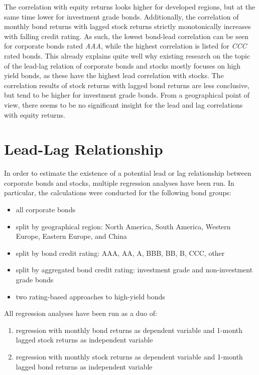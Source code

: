 The correlation with equity returns looks higher for developed regions, but at the same time lower for investment grade bonds. 
Additionally, the correlation of monthly bond returns with lagged stock returns strictly monotonically increases with falling credit rating. As such, the lowest bond-lead correlation can be seen for corporate bonds rated \textit{AAA}, while the highest correlation is listed for \textit{CCC} rated bonds. This already explains quite well why existing research on the topic of the lead-lag relation of corporate bonds and stocks mostly focuses on high yield bonds, as these have the highest lead correlation with stocks. The correlation results of stock returns with lagged bond returns are less conclusive, but tend to be higher for investment grade bonds. From a geographical point of view, there seems to be no significant insight for the lead and lag correlations with equity returns. 

\section{Lead-Lag Relationship} \label{section:lead-lag-relationship}
In order to estimate the existence of a potential lead or lag relationship between corporate bonds and stocks, multiple regression analyses have been run. In particular, the calculations were conducted for the following bond groups: 
\begin{itemize}
	\item all corporate bonds
	\item split by geographical region: North America, South America, Western Europe, Eastern Europe, and China
	\item split by bond credit rating: AAA, AA, A, BBB, BB, B, CCC, other
	\item split by aggregated bond credit rating: investment grade and non-investment grade bonds
	\item two rating-based approaches to high-yield bonds
\end{itemize}
All regression analyses have been run as a duo of: 
\begin{enumerate}
	\item regression with monthly bond returns as dependent variable and 1-month lagged stock returns as independent variable
	\item regression with monthly stock returns as dependent variable and 1-month lagged bond returns as independent variable
\end{enumerate}

